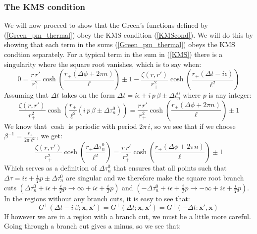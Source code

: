 \subsubsection{The KMS condition}
We will now proceed to show that the Green's functions defined by (\ref{Green_pm_thermal}) obey the KMS condition (\ref{KMScond}). We will do this by showing that each term in the sums (\ref{Green_pm_thermal}) obeys the KMS condtion separately.  
%
%
For a typical term in the sum in (\ref{KMS}) there is a singularity where the square root vanishes, which is to say when:
%
%
\begin{equation}
0 = \frac{r \, r'}{r_+^2} \cosh \left(
\frac{r_+ (\Delta \phi + 2 \pi n)}{\ell}
\right) \pm 1 - \frac{\zeta(r,r')}{r_+^2} \cosh \left(
\frac{r_+ (\Delta t - i \epsilon)}{\ell^2}
\right)
\end{equation}
%
%
Assuming that $\Delta t$ takes on the form 
$\Delta t = i \epsilon + i \, p \, \beta \pm \Delta t_n^0$ where $p$ is any integer:
%
%
\begin{equation}
\frac{\zeta(r, r')}{r_+^2} \cosh \left(
\frac{r_+}{\ell^2} \left( i \, p \, \beta \pm \Delta \tau_n^0
\right) \right) 
=
\frac{r \, r'}{r_+^2} \cosh \left(
\frac{r_+ (\Delta \phi + 2 \pi n)}{\ell}
\right) \pm 1
\end{equation}
%
%
We know that $\cosh$ is periodic with period $2 \pi \, i$, so we see that if we choose $\beta^{-1} = \frac{r_+}{2 \pi \ell^2}$, we get:
\begin{equation}
\frac{\zeta(r, r')}{r_+^2}
\cosh \left(\frac{r_+ \Delta \tau_n^0}{\ell^2} \right)
=
\frac{r \, r'}{r_+^2} \cosh \left(
\frac{r_+ (\Delta \phi + 2 \pi n)}{\ell}
\right) \pm 1
\end{equation}
%
%
Which serves as a definition of $\Delta \tau_n^0$ that ensures that all points such that $\Delta \tau = i \epsilon + \frac{i}{T} p \pm \Delta \tau_n^0$ are singular and we therefore make the square root branch cuts $(\Delta \tau_n^0 + i \epsilon + \frac{i}{T} p \longrightarrow \infty + i \epsilon + \frac{i}{T} p)$ and $(-\Delta \tau_n^0 + i \epsilon + \frac{i}{T} p \longrightarrow -\infty + i \epsilon + \frac{i}{T} p)$.
%
%
In the regions without any branch cuts, it is easy to see that:
\begin{equation}
G^+(\Delta t - i \, \beta; \mathbf{x}, \mathbf{x'}) = G^+(\Delta t; \mathbf{x}, \mathbf{x'}) = G^+(- \Delta t: \mathbf{x'}, \mathbf{x})
\end{equation}
%
%
If however we are in a region with a branch cut, we must be a little more careful. Going through a branch cut gives a minus, so we see that:
